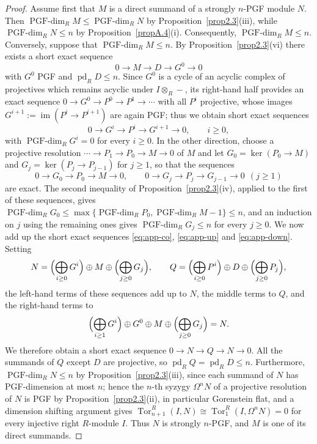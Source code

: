 \documentclass[12pt]{amsart}
\theoremstyle{remark}
\theoremstyle{definition}
\theoremstyle{plain}
\DeclareMathOperator{\pd}{pd}
\DeclareMathOperator{\Tor}{Tor}
\DeclareMathOperator{\im}{im}
\newcommand{\PGFdim}{\operatorname{PGF\text{-}dim}}
\begin{document}
\begin{proof}
Assume first that $M$ is a direct summand of a strongly $n$-PGF module $N$. Then $\PGFdim_RM\le\PGFdim_RN$ by Proposition~\ref{prop2.3}(iii), while $\PGFdim_RN\le n$ by Proposition~\ref{propA.4}(i). Consequently, $\PGFdim_RM\le n$. Conversely, suppose that $\PGFdim_RM\le n$. By Proposition~\ref{prop2.3}(vi) there exists a short exact sequence
\begin{equation}\label{eq:app-up}
0\rightarrow M\rightarrow D\rightarrow G^0\rightarrow0
\end{equation}
with $G^0$ PGF and $\pd_RD\le n$. Since $G^0$ is a cycle of an acyclic complex of projectives which remains acyclic under $I\otimes_R-$, its right-hand half provides an exact sequence $0\to G^0\to P^0\to P^1\to\cdots$ with all $P^i$ projective, whose images $G^{i+1}:=\im(P^i\to P^{i+1})$ are again PGF; thus we obtain short exact sequences
\begin{equation}\label{eq:app-co}
0\rightarrow G^i\rightarrow P^i\rightarrow G^{i+1}\rightarrow0,
\qquad i\ge0,
\end{equation}
with $\PGFdim_RG^i=0$ for every $i\ge0$. In the other direction, choose a projective resolution $\cdots\to P_1\to P_0\to M\to0$ of $M$ and let $G_0=\ker(P_0\to M)$ and $G_j=\ker(P_j\to P_{j-1})$ for $j\ge1$, so that the sequences
\begin{equation}\label{eq:app-down}
0\rightarrow G_0\rightarrow P_0\rightarrow M\rightarrow0,
\qquad
0\rightarrow G_j\rightarrow P_j\rightarrow G_{j-1}\rightarrow0\ \ (j\ge1)
\end{equation}
are exact. The second inequality of Proposition~\ref{prop2.3}(iv), applied to the first of these sequences, gives $\PGFdim_RG_0\le\max\{\PGFdim_RP_0,\PGFdim_RM-1\}\le n$, and an induction on $j$ using the remaining ones gives $\PGFdim_RG_j\le n$ for every $j\ge0$. We now add up the short exact sequences \eqref{eq:app-co}, \eqref{eq:app-up} and \eqref{eq:app-down}. Setting
\[
N=\Bigl(\bigoplus_{i\ge0}G^i\Bigr)\oplus M\oplus\Bigl(\bigoplus_{j\ge0}G_j\Bigr),
\qquad
Q=\Bigl(\bigoplus_{i\ge0}P^i\Bigr)\oplus D\oplus\Bigl(\bigoplus_{j\ge0}P_j\Bigr),
\]
the left-hand terms of these sequences add up to $N$, the middle terms to $Q$, and the right-hand terms to
\[
\Bigl(\bigoplus_{i\ge1}G^i\Bigr)\oplus G^0\oplus M\oplus\Bigl(\bigoplus_{j\ge0}G_j\Bigr)=N .
\]
We therefore obtain a short exact sequence $0\rightarrow N\rightarrow Q\rightarrow N\rightarrow0.$
All the summands of $Q$ except $D$ are projective, so $\pd_RQ=\pd_RD\le n$. Furthermore, $\PGFdim_RN\le n$ by Proposition~\ref{prop2.3}(iii), since each summand of $N$ has PGF-dimension at most $n$; hence the $n$-th syzygy $\Omega^nN$ of a projective resolution of $N$ is PGF by Proposition~\ref{prop2.3}(ii), in particular Gorenstein flat, and a dimension shifting argument gives $\Tor^R_{n+1}(I,N)\cong\Tor^R_1(I,\Omega^nN)=0$ for every injective right $R$-module $I$. Thus $N$ is strongly $n$-PGF, and $M$ is one of its direct summands.
\end{proof}
\end{document}
